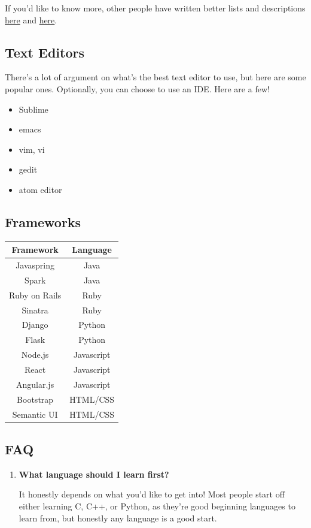 \documentclass{article}
\begin{document}
\hspace{0.5cm} If you'd like to know more, other people have written better lists and descriptions  \href{https://www.quora.com/What-are-the-pros-and-cons-and-uses-of-the-major-programming-languages}{here} and \href{https://www.quora.com/What-are-the-pros-and-cons-and-uses-of-the-major-programming-languages}{here}. 
\subsection{Text Editors}
\hspace{0.5cm}There's a lot of argument on what's the best text editor to use, but here are some popular ones. Optionally, you can choose to use an IDE. Here are a few! 
\begin{itemize}
    \item Sublime 
    \item emacs
    \item vim, vi
    \item gedit 
    \item atom editor
\end{itemize}
\subsection{Frameworks}
\begin{tabular}{|c|c|}
\hline
\textbf{Framework} & \textbf{Language} \\
\hline
Javaspring & Java  \\
\hline
Spark & Java  \\
\hline
Ruby on Rails & Ruby  \\
\hline
Sinatra & Ruby \\
\hline
Django & Python  \\
\hline
Flask & Python  \\
\hline
Node.js & Javascript  \\
\hline
React & Javascript  \\
\hline
Angular.js & Javascript  \\
\hline
Bootstrap & HTML/CSS  \\
\hline
Semantic UI & HTML/CSS \\
\hline
\end{tabular}

\subsection{FAQ}
\begin{enumerate}
    \item \textbf{What language should I learn first?}
    \begin{itemize}
        It honestly depends on what you'd like to get into! Most people start off either learning C, C++, or Python, as they're good beginning languages to learn from, but honestly any language is a good start. 
    \end{itemize}
\end{enumerate}
\newpage
\end{document}

